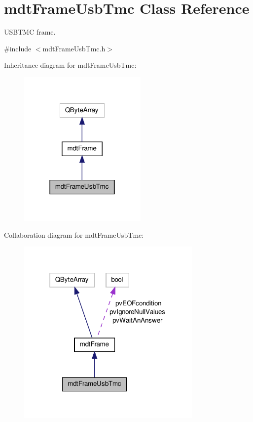 \hypertarget{classmdt_frame_usb_tmc}{\section{mdt\-Frame\-Usb\-Tmc Class Reference}
\label{classmdt_frame_usb_tmc}
}


U\-S\-B\-T\-M\-C frame.  




{\ttfamily \#include $<$mdt\-Frame\-Usb\-Tmc.\-h$>$}



Inheritance diagram for mdt\-Frame\-Usb\-Tmc\-:
\nopagebreak
\begin{figure}[H]
\begin{center}
\leavevmode
\includegraphics[width=178pt]{classmdt_frame_usb_tmc__inherit__graph}
\end{center}
\end{figure}


Collaboration diagram for mdt\-Frame\-Usb\-Tmc\-:
\nopagebreak
\begin{figure}[H]
\begin{center}
\leavevmode
\includegraphics[width=256pt]{classmdt_frame_usb_tmc__coll__graph}
\end{center}
\end{figure}
